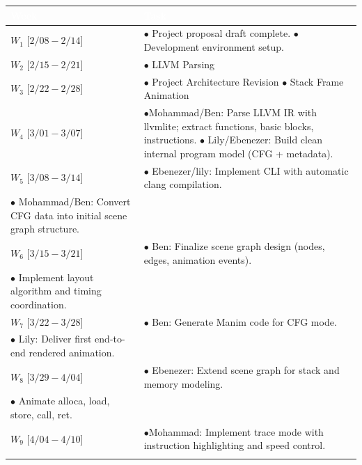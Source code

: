 \begin{table}[htbp]
\centering
\renewcommand{\arraystretch}{1.5}
\begin{tabularx}{\columnwidth}{|>{\centering\arraybackslash}m{2.5cm}|>{\raggedright\arraybackslash}X|}
\hline
\rowcolor[HTML]{4472C4}
\textcolor{white}{\textbf{Week}} & \textcolor{white}{\textbf{Task}} \\ \hline
$W_1$    [$2/08 - 2/14$] & $\bullet$ Project proposal draft complete.\newline
                           $\bullet$ Development environment setup. \\ \hline
$W_2$    [$2/15 - 2/21$] & $\bullet$ LLVM Parsing \\ \hline
$W_3$    [$2/22 - 2/28$] & $\bullet$ Project Architecture Revision\newline
                           $\bullet$ Stack Frame Animation \\ \hline
$W_4$    [$3/01 - 3/07$] & $\bullet$Mohammad/Ben: Parse LLVM IR with llvmlite; extract functions, basic blocks, instructions.\newline
                           $\bullet$ Lily/Ebenezer: Build clean internal program model (CFG + metadata). \\ \hline
$W_5$    [$3/08 - 3/14$] & $\bullet$ Ebenezer/lily: Implement CLI with automatic clang compilation.\\ \newline
                      $\bullet$ Mohammad/Ben: Convert CFG data into initial scene graph structure.\\ \hline
$W_6$    [$3/15 - 3/21$] & $\bullet$ Ben: Finalize scene graph design (nodes, edges, animation events). \\ \newline
                         $\bullet$   Implement layout algorithm and timing coordination.            \\ \hline
$W_7$    [$3/22 - 3/28$] & $\bullet$ Ben: Generate Manim code for CFG mode.
 \\ \newline
 $\bullet$      Lily: Deliver first end-to-end rendered animation.      \\ \hline
$W_8$    [$3/29 - 4/04$] & $\bullet$ Ebenezer: Extend scene graph for stack and memory modeling.\\ \newline
$\bullet$       Animate alloca, load, store, call, ret.    \\ \hline
$W_9$    [$4/04 - 4/10$] & $\bullet$Mohammad: Implement trace mode with instruction highlighting and speed control.\\ \newline
  

\end{tabularx}
\end{table}

